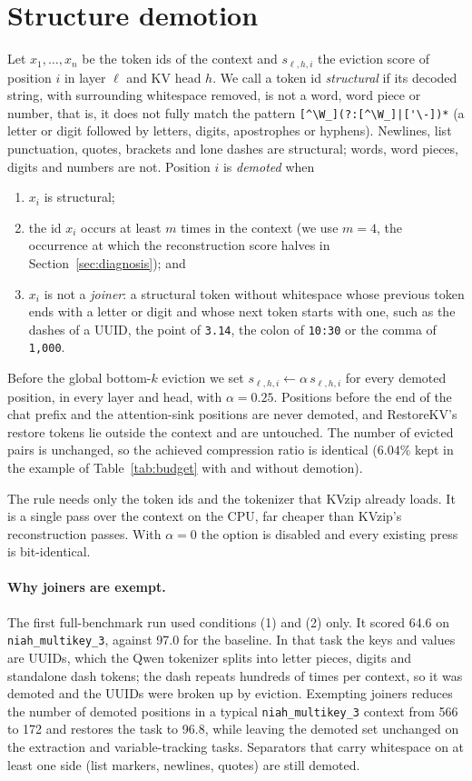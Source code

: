 \documentclass[11pt]{article}
\begin{document}
\section{Structure demotion}
\label{sec:method}
Let $x_1,\dots,x_n$ be the token ids of the context and $s_{\ell,h,i}$ the eviction score of position $i$ in layer $\ell$ and KV head
$h$. We call a token id \emph{structural} if its decoded string, with surrounding whitespace removed, is not a word, word piece or
number, that is, it does not fully match the pattern \verb+[^\W_](?:[^\W_]|['\-])*+ (a letter or digit followed by letters,
digits, apostrophes or hyphens). Newlines, list punctuation, quotes, brackets and lone dashes are structural; words, word pieces,
digits and numbers are not. Position $i$ is \emph{demoted} when
\begin{enumerate}
  \item $x_i$ is structural;
  \item the id $x_i$ occurs at least $m$ times in the context (we use $m=4$, the occurrence at which the reconstruction score halves
        in Section~\ref{sec:diagnosis}); and
  \item $x_i$ is not a \emph{joiner}: a structural token without whitespace whose previous token ends with a letter or digit and whose
        next token starts with one, such as the dashes of a UUID, the point of \texttt{3.14}, the colon of \texttt{10:30} or the comma
        of \texttt{1,000}.
\end{enumerate}
Before the global bottom-$k$ eviction we set $s_{\ell,h,i} \leftarrow \alpha\, s_{\ell,h,i}$ for every demoted position, in every
layer and head, with $\alpha = 0.25$. Positions before the end of the chat prefix and the attention-sink positions are never
demoted, and RestoreKV's restore tokens lie outside the context and are untouched. The number of evicted pairs is unchanged, so the
achieved compression ratio is identical ($6.04\%$ kept in the example of Table~\ref{tab:budget} with and without demotion).

The rule needs only the token ids and the tokenizer that KVzip already loads. It is a single pass over the context on the CPU, far
cheaper than KVzip's reconstruction passes. With $\alpha=0$ the option is disabled and every existing press is bit-identical.

\paragraph{Why joiners are exempt.} The first full-benchmark run used conditions (1) and (2) only. It scored 64.6 on
\texttt{niah\_multikey\_3}, against 97.0 for the baseline. In that task the keys and values are UUIDs, which the Qwen tokenizer
splits into letter pieces, digits and standalone dash tokens; the dash repeats hundreds of times per context, so it was demoted and
the UUIDs were broken up by eviction. Exempting joiners reduces the number of demoted positions in a typical
\texttt{niah\_multikey\_3} context from 566 to 172 and restores the task to 96.8, while leaving the demoted set unchanged on the
extraction and variable-tracking tasks. Separators that carry whitespace on at least one side (list markers, newlines, quotes) are
still demoted.
\end{document}
